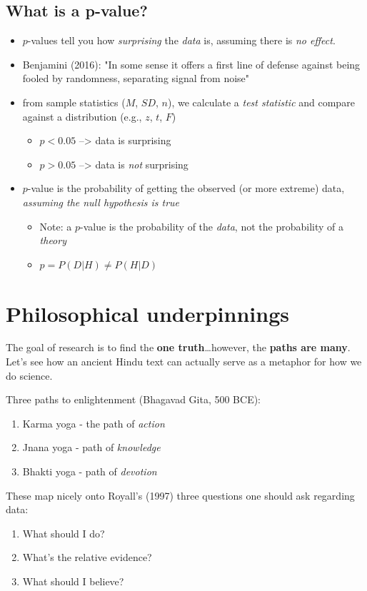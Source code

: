 \documentclass[11pt]{article}
\begin{document}
\subsection*{What is a p-value?}
\label{sec-2-1}
\begin{itemize}
\item $p$-values tell you how \emph{surprising} the \emph{data} is, assuming there is \emph{no effect}.
\item Benjamini (2016): "In some sense it offers a first line of defense against being fooled by randomness, separating signal from noise"
\item from sample statistics ($M$, $SD$, $n$), we calculate a \emph{test statistic} and compare against a distribution (e.g., $z$, $t$, $F$)
\begin{itemize}
\item $p<0.05$ --> data is surprising
\item $p>0.05$ --> data is \emph{not} surprising
\end{itemize}
\item $p$-value is the probability of getting the observed (or more extreme) data, \emph{assuming the null hypothesis is true}
\begin{itemize}
\item Note: a $p$-value is the probability of the \emph{data}, not the probability of a \emph{theory}
\item $p = P(D|H) \neq P(H|D)$
\end{itemize}
\end{itemize}

\section*{Philosophical underpinnings}
\label{sec-3}
The goal of research is to find the \textbf{one truth}\ldots{}however, the \textbf{paths are many}.  Let's see how an ancient Hindu text can actually serve as a metaphor for how we do science.

Three paths to enlightenment (Bhagavad Gita, 500 BCE):
\begin{enumerate}
\item Karma yoga - the path of \emph{action}
\item Jnana yoga - path of \emph{knowledge}
\item Bhakti yoga - path of \emph{devotion}
\end{enumerate}

These map nicely onto Royall's (1997) three questions one should ask regarding data:
\begin{enumerate}
\item What should I do?
\item What's the relative evidence?
\item What should I believe?
\end{enumerate}
\end{document}
